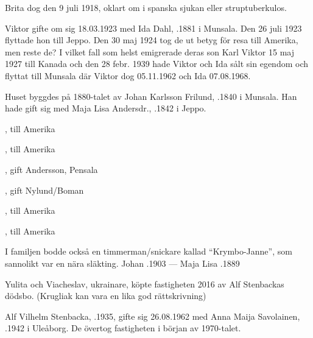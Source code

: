 Brita dog den 9 juli 1918, oklart om i spanska sjukan eller struptuberkulos.


Viktor gifte om sig 18.03.1923 med Ida Dahl, .1881 i Munsala. Den 26 juli 1923 flyttade hon till Jeppo. Den 30 maj 1924 tog de ut betyg för resa till Amerika, men reste de? I vilket fall som helst emigrerade deras son Karl Viktor 15 maj 1927 till Kanada och den 28 febr. 1939 hade Viktor och Ida sålt sin egendom och flyttat till Munsala där Viktor dog 05.11.1962 och Ida 07.08.1968.


Huset byggdes på 1880-talet av Johan Karlsson Frilund, .1840 i Munsala. Han hade gift sig med Maja Lisa Andersdr., .1842 i Jeppo.
\begin{jhchildren}
  \item {}, till Amerika
  \item {}, till Amerika
  \item {}
  \item {}, gift Andersson, Pensala
  \item {}, gift Nylund/Boman
  \item {}, till Amerika
  \item {}, till Amerika
\end{jhchildren}
I familjen bodde också en timmerman/snickare kallad ``Krymbo-Janne'', som sannolikt var en nära släkting.
Johan .1903  ---  Maja Lisa .1889





Yulita och Viacheslav, ukrainare, köpte fastigheten 2016 av Alf Stenbackas dödsbo. (Krugliak kan vara en lika god rättskrivning)\jhvspace{}



Alf Vilhelm Stenbacka, .1935, gifte sig 26.08.1962 med Anna Maija Savolainen, .1942 i Uleåborg. De övertog fastigheten i början av 1970-talet.

